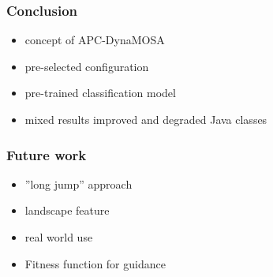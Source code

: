 
\begin{frame}
	\frametitle{Conclusion}

	\begin{itemize}
		\item concept of APC-DynaMOSA
		\item pre-selected configuration
		\item pre-trained classification model
		\item mixed results improved and degraded Java classes
	\end{itemize}
	
\end{frame}

\begin{frame}
	\frametitle{Future work}

	\begin{itemize}
		\item ''long jump'' approach
		\item landscape feature
		\item real world use
		\item Fitness function for guidance
	\end{itemize}
	
\end{frame}